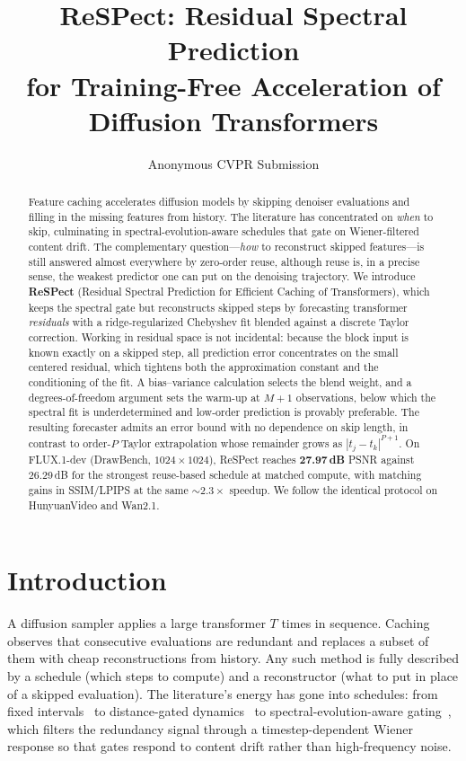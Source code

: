 \documentclass[10pt,twocolumn,letterpaper]{article}
\title{ReSPect: Residual Spectral Prediction\\for Training-Free Acceleration of Diffusion Transformers}
\author{Anonymous CVPR Submission}
\date{}
\begin{document}
\maketitle

\begin{abstract}
Feature caching accelerates diffusion models by skipping denoiser
evaluations and filling in the missing features from history. The
literature has concentrated on \emph{when} to skip, culminating in
spectral-evolution-aware schedules that gate on Wiener-filtered content
drift. The complementary question---\emph{how} to reconstruct skipped
features---is still answered almost everywhere by zero-order reuse,
although reuse is, in a precise sense, the weakest predictor one can put
on the denoising trajectory. We introduce \textbf{ReSPect} (Residual
Spectral Prediction for Efficient Caching of Transformers), which keeps
the spectral gate but reconstructs skipped steps by forecasting
transformer \emph{residuals} with a ridge-regularized Chebyshev fit
blended against a discrete Taylor correction. Working in residual space
is not incidental: because the block input is known exactly on a skipped
step, all prediction error concentrates on the small centered residual,
which tightens both the approximation constant and the conditioning of
the fit. A bias--variance calculation selects the blend weight, and a
degrees-of-freedom argument sets the warm-up at $M{+}1$ observations,
below which the spectral fit is underdetermined and low-order prediction
is provably preferable. The resulting forecaster admits an error bound
with no dependence on skip length, in contrast to order-$P$ Taylor
extrapolation whose remainder grows as $|t_j - t_k|^{P+1}$. On
FLUX.1-dev (DrawBench, $1024{\times}1024$), ReSPect reaches
\textbf{27.97\,dB} PSNR against 26.29\,dB for the strongest reuse-based
schedule at matched compute, with matching gains in SSIM/LPIPS at the
same ${\sim}2.3{\times}$ speedup. We follow the identical protocol on
HunyuanVideo and Wan2.1.
\end{abstract}

\section{Introduction}
\label{sec:intro}

A diffusion sampler applies a large transformer $T$ times in sequence.
Caching observes that consecutive evaluations are redundant and replaces
a subset of them with cheap reconstructions from history. Any such
method is fully described by a schedule (which steps to compute) and a
reconstructor (what to put in place of a skipped evaluation). The
literature's energy has gone into schedules: from fixed
intervals~\cite{fora} to distance-gated dynamics~\cite{teacache} to
spectral-evolution-aware gating~\cite{seacache}, which filters the
redundancy signal through a timestep-dependent Wiener response so that
gates respond to content drift rather than high-frequency noise.
\end{document}
